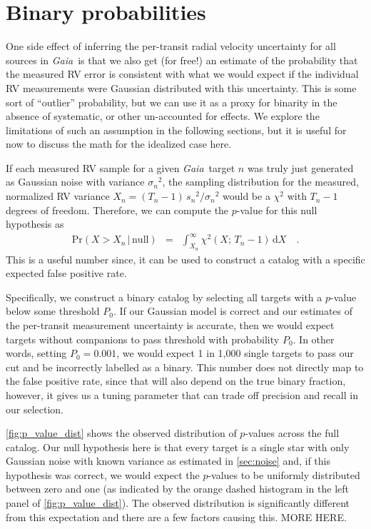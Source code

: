 \documentclass[modern, letterpaper]{aastex631}
\newcommand{\project}[1]{\textsl{#1}}
\newcommand{\Gaia}{\project{Gaia}}
\newcommand{\dd}{\ensuremath{\,\mathrm{d}}}
\begin{document}
\section{Binary probabilities}

One side effect of inferring the per-transit radial velocity uncertainty for all sources in \Gaia\ is that we also get (for free!) an estimate of the probability that the measured RV error is consistent with what we would expect if the individual RV measurements were Gaussian distributed with this uncertainty.
This is some sort of ``outlier'' probability, but we can use it as a proxy for binarity in the absence of systematic, or other un-accounted for effects.
We explore the limitations of such an assumption in the following sections, but it is useful for now to discuss the math for the idealized case here.

If each measured RV sample for a given \Gaia\ target $n$ was truly just generated as Gaussian noise with variance ${\sigma_n}^2$, the sampling distribution for the measured, normalized RV variance $X_n = (T_n - 1)\,{s_n}^2 / {\sigma_n}^2$ would be a $\chi^2$ with $T_n - 1$ degrees of freedom.
Therefore, we can compute the $p$-value for this null hypothesis as
\begin{eqnarray}
	\mathrm{Pr}(X > X_n\,|\,\mathrm{null}) &=& \int_{X_n}^\infty \chi^2 (X;\,T_n-1) \dd X \quad.
\end{eqnarray}
This is a useful number since, it can be used to construct a catalog with a specific expected false positive rate.

Specifically, we construct a binary catalog by selecting all targets with a $p$-value below some threshold $P_0$.
If our Gaussian model is correct and our estimates of the per-transit measurement uncertainty is accurate, then we would expect targets without companions to pass threshold with probability $P_0$.
In other words, setting $P_0 = 0.001$, we would expect 1 in 1,000 single targets to pass our cut and be incorrectly labelled as a binary.
This number does not directly map to the false positive rate, since that will also depend on the true binary fraction, however, it gives us a tuning parameter that can trade off precision and recall in our selection.

\autoref{fig:p_value_dist} shows the observed distribution of $p$-values across the full catalog.
Our null hypothesis here is that every target is a single star with only Gaussian noise with known variance as estimated in \autoref{sec:noise} and, if this hypothesis was correct, we would expect the $p$-values to be uniformly distributed between zero and one (as indicated by the orange dashed histogram in the left panel of \autoref{fig:p_value_dist}).
The observed distribution is significantly different from this expectation and there are a few factors causing this.
MORE HERE.
\end{document}
